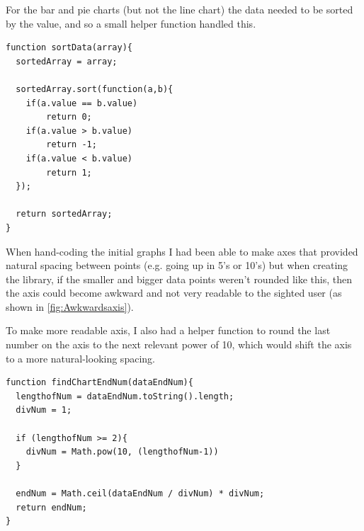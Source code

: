 \documentclass[ %
                    author={Aleena Baig},
                supervisor={Dr Simon Lock},
                    degree={BSc},
                     title={On Making Web Accessible Graphs},
                  subtitle={},
                      year={2019} ]{dissertation}
\begin{document}
For the bar and pie charts (but not the line chart) the data needed to be sorted by the value, and so a small helper function handled this.

\begin{lstlisting}
function sortData(array){
  sortedArray = array;

  sortedArray.sort(function(a,b){
    if(a.value == b.value)
        return 0;
    if(a.value > b.value)
        return -1;
    if(a.value < b.value)
        return 1;
  });

  return sortedArray;
}
\end{lstlisting}

When hand-coding the initial graphs I had been able to make axes that provided natural spacing between points (e.g. going up in 5's or 10's) but when creating the library, if the smaller and bigger data points weren't rounded like this, then the axis could become awkward and not very readable to the sighted user (as shown in \ref{fig:Awkwardsaxis}).

To make more readable axis, I also had a helper function to round the last number on the axis to the next relevant power of 10, which would shift the axis to a more natural-looking spacing.

\begin{lstlisting}
function findChartEndNum(dataEndNum){
  lengthofNum = dataEndNum.toString().length;
  divNum = 1;

  if (lengthofNum >= 2){
    divNum = Math.pow(10, (lengthofNum-1))
  }

  endNum = Math.ceil(dataEndNum / divNum) * divNum;
  return endNum;
}
\end{lstlisting}
\end{document}
